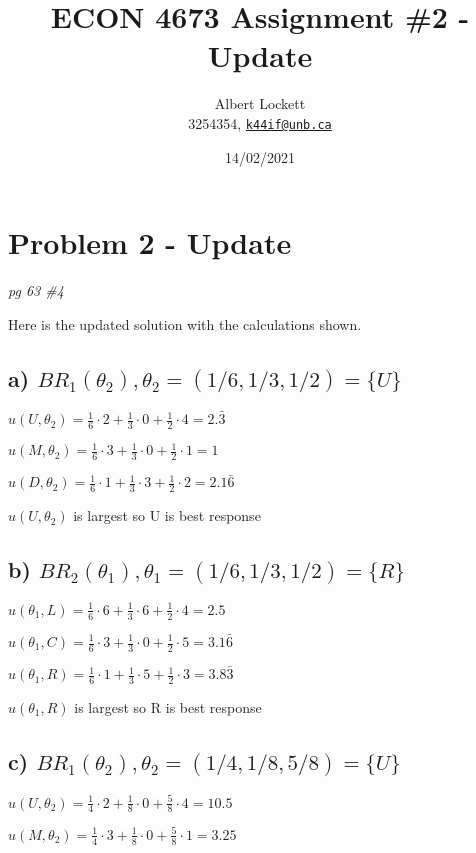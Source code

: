 \documentclass[a4paper,11pt]{article}
\begin{document}
\title{ECON 4673 Assignment \#2 - Update}
\author{
  Albert Lockett \\ 
  3254354, 
  \href{mailto:k44if@unb.ca}{\texttt{k44if@unb.ca}}
  }
\date{14/02/2021}

\section*{Problem 2 - Update}
\textit{pg 63 \#4}

Here is the updated solution with the calculations shown.

\subsection*{a) $ BR_1(\theta_2), \theta_2 = (1/6, 1/3, 1/2) = \{U\}$}

$u(U,\theta_2) = \frac{1}{6} \cdot 2 + \frac{1}{3} \cdot 0 + \frac{1}{2} \cdot 4 = 2.\bar{3}$

$u(M,\theta_2) = \frac{1}{6} \cdot 3 + \frac{1}{3} \cdot 0 + \frac{1}{2} \cdot 1 = 1$

$u(D,\theta_2) = \frac{1}{6} \cdot 1 + \frac{1}{3} \cdot 3 + \frac{1}{2} \cdot 2 = 2.1\bar{6}$

$u(U,\theta_2)$ is largest so {U} is best response


\subsection*{b) $ BR_2(\theta_1), \theta_1 = (1/6, 1/3, 1/2) = \{R\}$}

$u(\theta_1,L) = \frac{1}{6} \cdot 6 + \frac{1}{3} \cdot 6 + \frac{1}{2} \cdot 4 = 2.5$

$u(\theta_1,C) = \frac{1}{6} \cdot 3 + \frac{1}{3} \cdot 0 + \frac{1}{2} \cdot 5 = 3.1\bar{6}$

$u(\theta_1,R) = \frac{1}{6} \cdot 1 + \frac{1}{3} \cdot 5 + \frac{1}{2} \cdot 3 = 3.8\bar{3}$

$u(\theta_1,R)$ is largest so {R} is best response


\subsection*{c) $ BR_1(\theta_2), \theta_2 = (1/4, 1/8, 5/8) = \{U\}$}

$u(U,\theta_2) = \frac{1}{4} \cdot 2 + \frac{1}{8} \cdot 0 + \frac{5}{8} \cdot 4 = 10.5$

$u(M,\theta_2) = \frac{1}{4} \cdot 3 + \frac{1}{8} \cdot 0 + \frac{5}{8} \cdot 1 = 3.25$
\end{document}
